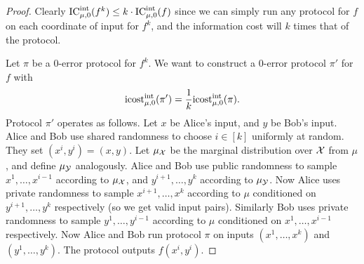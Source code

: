 \begin{proof}
Clearly $\mathrm{IC}^{\mathrm{int}}_{\mu,0}(f^k) \leq k \cdot \mathrm{IC}^{\mathrm{int}}_{\mu,0}(f)$ since we can simply run any protocol for $f$ on each coordinate of input for $f^k$, and the information cost will $k$ times that of the protocol.

Let $\pi$ be a $0$-error protocol for $f^k$. We want to construct a $0$-error protocol $\pi'$ for $f$ with
$$\mathrm{icost}^{\mathrm{int}}_{\mu,0}(\pi') = \frac{1}{k}\mathrm{icost}^{\mathrm{int}}_{\mu,0}(\pi).$$
Protocol $\pi'$ operates as follows. Let $x$ be Alice's input, and $y$ be Bob's input. Alice and Bob use shared randomness to choose $i \in [k]$ uniformly at random. They set $(x^i,y^i) = (x,y)$. Let $\mu_{\mathcal{X}}$ be the marginal distribution over $\mathcal{X}$ from $\mu$, and define $\mu_{\mathcal{Y}}$ analogously. Alice and Bob use public randomness to sample $x^1,\dots,x^{i-1}$ according to $\mu_{\mathcal{X}}$, and $y^{i+1},\dots, y^k$ according to $\mu_{\mathcal{Y}}$. Now Alice uses private randomness to sample $x^{i+1}, \dots, x^{k}$ according to $\mu$ conditioned on $y^{i+1},\dots, y^k$ respectively (so we get valid input pairs). Similarly Bob uses private randomness to sample $y^{1}, \dots, y^{i-1}$ according to $\mu$ conditioned on $x^{1},\dots, x^{i-1}$ respectively. Now Alice and Bob run protocol $\pi$ on inputs $(x^1,\dots, x^k)$ and $(y^1,\dots, y^k)$. The protocol outputs $f(x^i,y^i)$.


\end{proof}
